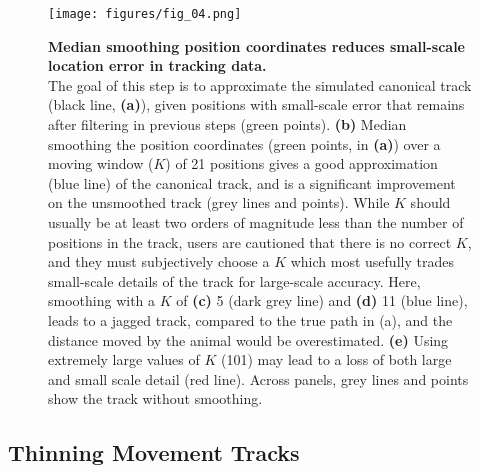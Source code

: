 \begin{refsection}[sorting=nyt]
    \begin{figure}[h!]
        \centering
        \texttt{[image: figures/fig\_04.png]}
        \caption{
            \textbf{Median smoothing position coordinates reduces small-scale location error in tracking data.}\\
            The goal of this step is to approximate the simulated canonical track (black line, \textbf{(a)}), given positions with small-scale error that remains after filtering in previous steps (green points).
            \textbf{(b)} Median smoothing the position coordinates (green points, in \textbf{(a)}) over a moving window ($K$) of 21 positions gives a good approximation (blue line) of the canonical track, and is a significant improvement on the unsmoothed track (grey lines and points).
            While $K$ should usually be at least two orders of magnitude less than the number of positions in the track, users are cautioned that there is no correct $K$, and they must subjectively choose a $K$ which most usefully trades small-scale details of the track for large-scale accuracy.
            Here, smoothing with a $K$ of \textbf{(c)} 5 (dark grey line) and \textbf{(d)} 11 (blue line), leads to a jagged track, compared to the true path in (a), and the distance moved by the animal would be overestimated.
            \textbf{(e)} Using extremely large values of $K$ (101) may lead to a loss of both large and small scale detail (red line).
            Across panels, grey lines and points show the track without smoothing.
        }
        \label{fig:figure_median_smooth}
    \end{figure}

    \subsection*{Thinning Movement Tracks}


\end{refsection}
